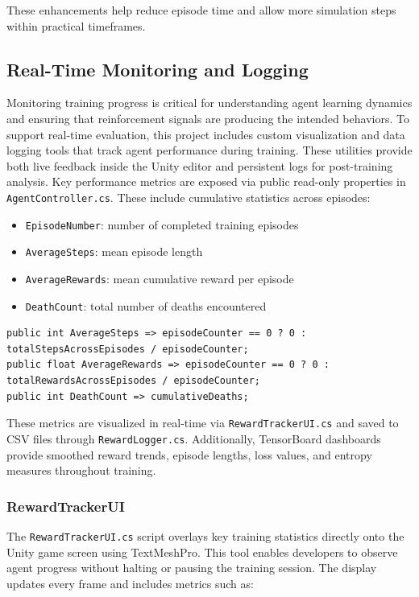 \documentclass[12pt,oneside,openright,a4paper]{cpe-english-project}
\begin{document}
These enhancements help reduce episode time and allow more simulation steps within practical timeframes.

\subsection{Real-Time Monitoring and Logging}
Monitoring training progress is critical for understanding agent learning dynamics and ensuring that reinforcement signals are producing the intended behaviors. To support real-time evaluation, this project includes custom visualization and data logging tools that track agent performance during training. These utilities provide both live feedback inside the Unity editor and persistent logs for post-training analysis.
Key performance metrics are exposed via public read-only properties in \texttt{AgentController.cs}. These include cumulative statistics across episodes:

\begin{itemize}
\item \texttt{EpisodeNumber}: number of completed training episodes
\item \texttt{AverageSteps}: mean episode length
\item \texttt{AverageRewards}: mean cumulative reward per episode
\item \texttt{DeathCount}: total number of deaths encountered
\end{itemize}

\begin{lstlisting}[language={[Sharp]C}]
public int AverageSteps => episodeCounter == 0 ? 0 : totalStepsAcrossEpisodes / episodeCounter;
public float AverageRewards => episodeCounter == 0 ? 0 : totalRewardsAcrossEpisodes / episodeCounter;
public int DeathCount => cumulativeDeaths;
\end{lstlisting}

These metrics are visualized in real-time via \texttt{RewardTrackerUI.cs} and saved to CSV files through \texttt{RewardLogger.cs}. Additionally, TensorBoard dashboards provide smoothed reward trends, episode lengths, loss values, and entropy measures throughout training.

\subsubsection{RewardTrackerUI}

The \texttt{RewardTrackerUI.cs} script overlays key training statistics directly onto the Unity game screen using TextMeshPro. This tool enables developers to observe agent progress without halting or pausing the training session. The display updates every frame and includes metrics such as:
\end{document}
